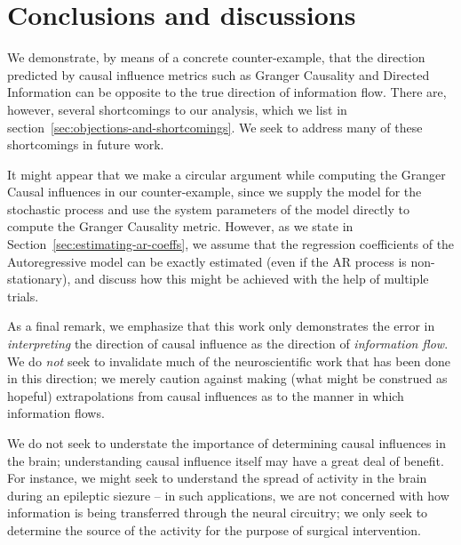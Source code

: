 \documentclass[letterpaper, 10pt, conference]{ieeeconf}
\begin{document}

\section{Conclusions and discussions}
\label{sec:conclusions}

We demonstrate, by means of a concrete counter-example, that the direction predicted by causal influence metrics such as Granger Causality and Directed Information can be opposite to the true direction of information flow. There are, however, several shortcomings to our analysis, which we list in section~\ref{sec:objections-and-shortcomings}. We seek to address many of these shortcomings in future work.

It might appear that we make a circular argument while computing the Granger Causal influences in our counter-example, since we supply the model for the stochastic process and use the system parameters of the model directly to compute the Granger Causality metric. However, as we state in Section~\ref{sec:estimating-ar-coeffs}, we assume that the regression coefficients of the Autoregressive model can be exactly estimated (even if the AR process is non-stationary), and discuss how this might be achieved with the help of multiple trials.

As a final remark, we emphasize that this work only demonstrates the error in \emph{interpreting} the direction of causal influence as the direction of \emph{information flow}. We do \emph{not} seek to invalidate much of the neuroscientific work that has been done in this direction; we merely caution against making (what might be construed as hopeful) extrapolations from causal influences as to the manner in which information flows.

We do not seek to understate the importance of determining causal influences in the brain; understanding causal influence itself may have a great deal of benefit. For instance, we might seek to understand the spread of activity in the brain during an epileptic siezure -- in such applications, we are not concerned with how information is being transferred through the neural circuitry; we only seek to determine the source of the activity for the purpose of surgical intervention.
\end{document}
